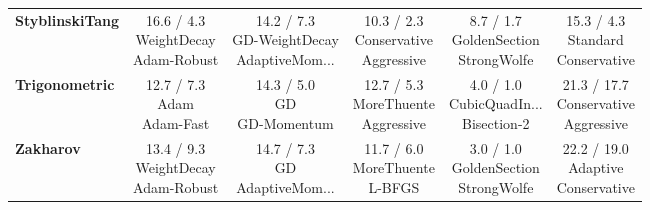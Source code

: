 \documentclass{article}
\begin{document}
\begin{longtable}{lccccc}
\textbf{StyblinskiTang} & \cellcolor{red!15} \makecell{16.6 / 4.3 \\ \scriptsize{WeightDecay} \\ \scriptsize{Adam-Robust}}&  \makecell{14.2 / 7.3 \\ \scriptsize{GD-WeightDecay} \\ \scriptsize{AdaptiveMom...}}&  \makecell{10.3 / 2.3 \\ \scriptsize{Conservative} \\ \scriptsize{Aggressive}}& \cellcolor{green!20} \makecell{8.7 / 1.7 \\ \scriptsize{GoldenSection} \\ \scriptsize{StrongWolfe}}&  \makecell{15.3 / 4.3 \\ \scriptsize{Standard} \\ \scriptsize{Conservative}} \\
\textbf{Trigonometric} &  \makecell{12.7 / 7.3 \\ \scriptsize{Adam} \\ \scriptsize{Adam-Fast}}&  \makecell{14.3 / 5.0 \\ \scriptsize{GD} \\ \scriptsize{GD-Momentum}}&  \makecell{12.7 / 5.3 \\ \scriptsize{MoreThuente} \\ \scriptsize{Aggressive}}& \cellcolor{green!20} \makecell{4.0 / 1.0 \\ \scriptsize{CubicQuadIn...} \\ \scriptsize{Bisection-2}}& \cellcolor{red!15} \makecell{21.3 / 17.7 \\ \scriptsize{Conservative} \\ \scriptsize{Aggressive}} \\
\textbf{Zakharov} &  \makecell{13.4 / 9.3 \\ \scriptsize{WeightDecay} \\ \scriptsize{Adam-Robust}}&  \makecell{14.7 / 7.3 \\ \scriptsize{GD} \\ \scriptsize{AdaptiveMom...}}&  \makecell{11.7 / 6.0 \\ \scriptsize{MoreThuente} \\ \scriptsize{L-BFGS}}& \cellcolor{green!20} \makecell{3.0 / 1.0 \\ \scriptsize{GoldenSection} \\ \scriptsize{StrongWolfe}}& \cellcolor{red!15} \makecell{22.2 / 19.0 \\ \scriptsize{Adaptive} \\ \scriptsize{Conservative}} \\
\end{longtable}
\end{document}
